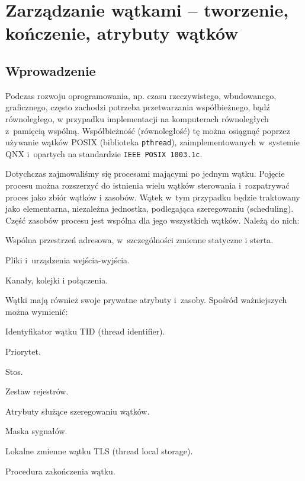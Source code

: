 \section{Zarządzanie wątkami – tworzenie, kończenie, atrybuty wątków}

\subsection{Wprowadzenie}

Podczas rozwoju oprogramowania, np. czasu rzeczywistego, wbudowanego, graficznego, często zachodzi potrzeba przetwarzania współbieżnego, bądź równoległego, w przypadku implementacji na komputerach równoległych z~pamięcią wspólną. Współbieżność (równoległość) tę można osiągnąć poprzez używanie wątków POSIX (biblioteka \lstinline[style=MyBashStyle]{pthread}), zaimplementowanych w~systemie QNX i~opartych na standardzie \lstinline[style=MyBashStyle]{IEEE POSIX 1003.1c}.

Dotychczas zajmowaliśmy się procesami mającymi po jednym wątku. Pojęcie procesu można rozszerzyć do istnienia wielu wątków sterowania i~rozpatrywać proces jako zbiór wątków i zasobów. Wątek w~tym przypadku będzie traktowany jako elementarna, niezależna jednostka, podlegająca szeregowaniu (scheduling). Część zasobów procesu jest wspólna dla jego wszystkich wątków. Należą do nich:

\begin{myitemize}
\item Wspólna przestrzeń adresowa, w~szczególności zmienne statyczne i sterta.
\item Pliki i~urządzenia wejścia-wyjścia.
\item Kanały, kolejki i połączenia.
\end{myitemize}

Wątki mają również swoje prywatne atrybuty i~zasoby. Spośród ważniejszych można wymienić:

\begin{myitemize}
\item Identyfikator wątku TID (thread identifier).
\item Priorytet.
\item Stos.
\item Zestaw rejestrów.
\item Atrybuty służące szeregowaniu wątków.
\item Maska sygnałów.
\item Lokalne zmienne wątku TLS (thread local storage).
\item Procedura zakończenia wątku.
\end{myitemize}

